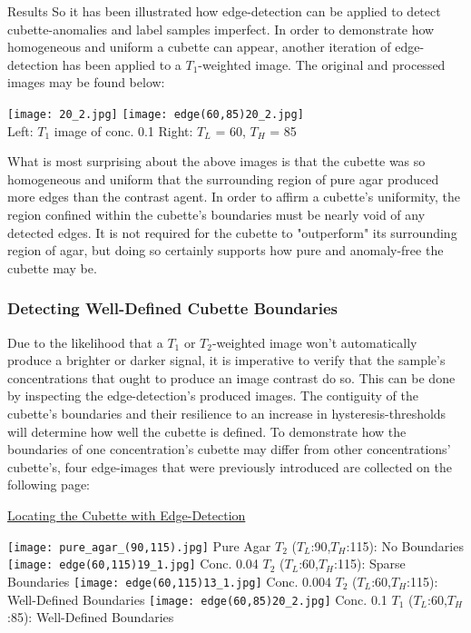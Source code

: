 \documentclass[a4paper,12pt]{article}
\begin{document}
\begin{section}{Results}
So it has been illustrated how edge-detection can be applied to detect cubette-anomalies and label samples imperfect. In order to demonstrate how homogeneous and uniform a cubette can appear, another iteration of edge-detection has been applied to a $T_1$-weighted image. The original and processed images may be found below:

\begin{center}
\texttt{[image: 20\_2.jpg]}
\texttt{[image: edge(60,85)20\_2.jpg]}\\
\small{Left: $T_1$ image of conc. 0.1} \hspace{13mm} \small{Right: $T_L$ = 60, $T_H$ = 85}
\end{center}

What is most surprising about the above images is that the cubette was so homogeneous and uniform that the surrounding region of pure agar produced more edges than the contrast agent. In order to affirm a cubette's uniformity, the region confined within the cubette's boundaries must be nearly void of any detected edges. It is not required for the cubette to "outperform" its surrounding region of agar, but doing so certainly supports how pure and anomaly-free the cubette may be.

\subsubsection{Detecting Well-Defined Cubette Boundaries}

Due to the likelihood that a $T_1$ or $T_2$-weighted image won't automatically produce a brighter or darker signal, it is imperative to verify that the sample's concentrations that ought to produce an image contrast do so. This can be done by inspecting the edge-detection's produced images. The contiguity of the cubette's boundaries and their resilience to an increase in hysteresis-thresholds will determine how well the cubette is defined. To demonstrate how the boundaries of one concentration's cubette may differ from other concentrations' cubette's, four edge-images that were previously introduced are collected on the following page:

\newpage
\begin{center} \underline{Locating the Cubette with Edge-Detection} \end{center}
\begin{flushleft}
\texttt{[image: pure\_agar\_(90,115).jpg]}		\hspace{0.5cm}\small{Pure Agar $T_2$ ($T_L$:90,$T_H$:115): No Boundaries}
\texttt{[image: edge(60,115)19\_1.jpg]}			\hspace{0.5cm}\small{Conc. 0.04 $T_2$ ($T_L$:60,$T_H$:115): Sparse Boundaries}
\texttt{[image: edge(60,115)13\_1.jpg]}			\hspace{0.5cm}\small{Conc. 0.004 $T_2$ ($T_L$:60,$T_H$:115): Well-Defined Boundaries}
\texttt{[image: edge(60,85)20\_2.jpg]}			\hspace{0.5cm}\small{Conc. 0.1 $T_1$ ($T_L$:60,$T_H$:85): Well-Defined Boundaries}
\end{flushleft}


\end{section}
\end{document}
